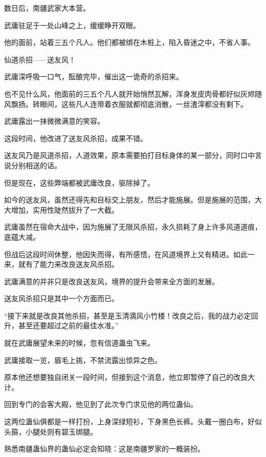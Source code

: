 
\begin{this_body}



数日后，南疆武家大本营。

武庸驻足于一处山峰之上，缓缓睁开双眼。

他的面前，站着三五个凡人。他们都被绑在木桩上，陷入昏迷之中，不省人事。

仙道杀招——送友风！

武庸深呼吸一口气，酝酿完毕，催出这一诡奇的杀招来。

也不见什么风，他面前的三五个凡人就开始悄然瓦解，浑身发皮肉骨都好似灰烬随风飘扬。转眼间，这些凡人连带着衣服就都彻底消散，一丝渣滓都没有剩下。

武庸露出一抹微微满意的笑容。

这段时间，他改进了送友风杀招，成果不错。

送友风乃是风道杀招，人道效果，原本需要拍打目标身体的某一部分，同时口中言说分别相送的话。

但是现在，这些弊端都被武庸改良，驱除掉了。

如今的送友风，虽然还得先和目标交上朋友，然后才能施展。但是施展的范围，大大增加，实用性陡然拔升了一大截。

武庸虽然在宿命大战中，因为施展了无限风杀招，永久损耗了身上许多风道道痕，底蕴大减。

但战后这段时间休整，他因失而得，有所感悟，在风道境界上又有精进。如此一来，就有了能力来改良送友风杀招。

武庸满意的并非只是改良送友风，境界的提升会带来全方面的发展。

送友风杀招只是其中一个方面而已。

“接下来就是改良其他杀招，甚至是玉清滴风小竹楼！改良之后，我的战力必定回升，甚至还要超过之前的最佳水准。”

就在武庸展望未来的时候，忽有信道蛊虫飞来。

武庸接取一览，眉毛上挑，不禁流露出惊异之色。

原本他还想要独自闭关一段时间，但接到这个消息，他立即暂停了自己的改良大计。

回到专门的会客大殿，他见到了此次专门求见他的两位蛊仙。

这两位蛊仙俱都是一样打扮，上身深绿短衫，下身黑色长裤。头戴一圈白布，好似头箍，小腿处则有碧玉绑腿。

熟悉南疆蛊仙界的蛊仙必定会知晓：这是南疆罗家的一概装扮。


\end{this_body}
